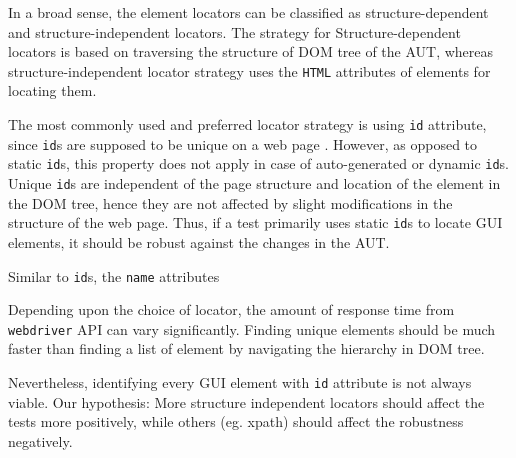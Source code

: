 In a broad sense, the element locators can be classified as structure-dependent and structure-independent locators. The strategy for Structure-dependent locators is based on traversing the structure of DOM tree of the AUT, whereas structure-independent locator strategy uses the \texttt{HTML} attributes of elements for locating them. 

The most commonly used and preferred locator strategy is using \texttt{id} attribute, since \texttt{id}s are supposed to be unique on a web page \cite{W3CIDs}. However, as opposed to static \texttt{id}s, this property does not apply in case of auto-generated or dynamic \texttt{id}s. Unique \texttt{id}s are independent of the page structure and location of the element in the DOM tree, hence they are not affected by slight modifications in the structure of the web page. Thus, if a test primarily uses static \texttt{id}s to locate GUI elements, it should be robust against the changes in the AUT. 

Similar to \texttt{id}s, the \texttt{name} attributes 

Depending upon the choice of locator, the amount of response time from \texttt{webdriver} API can vary significantly. Finding unique elements should be much faster than finding a list of element by navigating the hierarchy in DOM tree. 

Nevertheless, identifying every GUI element with \texttt{id} attribute is not always viable.
Our hypothesis: More structure independent locators should affect the tests more positively, while others (eg. xpath) should affect the robustness negatively. 








